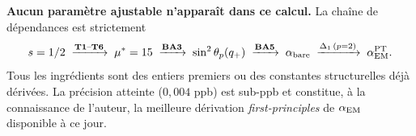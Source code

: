 \textbf{Aucun paramètre ajustable n'apparaît dans ce calcul.} La chaîne de dépendances est strictement
\[
s = 1/2 \;\xrightarrow{\textbf{T1}\text{--}\textbf{T6}}\; \mu^{*} = 15
\;\xrightarrow{\textbf{BA3}}\; \sin^{2}\theta_{p}(q_{+})
\;\xrightarrow{\textbf{BA5}}\; \alpha_{\rm bare}
\;\xrightarrow{\Delta_1\,(p=2)}\; \alpha_{\rm EM}^{\rm PT}.
\]
Tous les ingrédients sont des entiers premiers ou des constantes structurelles déjà dérivées. La précision atteinte ($0{,}004$ ppb) est sub-ppb et constitue, à la connaissance de l'auteur, la meilleure dérivation \emph{first-principles} de $\alpha_{\rm EM}$ disponible à ce jour.
